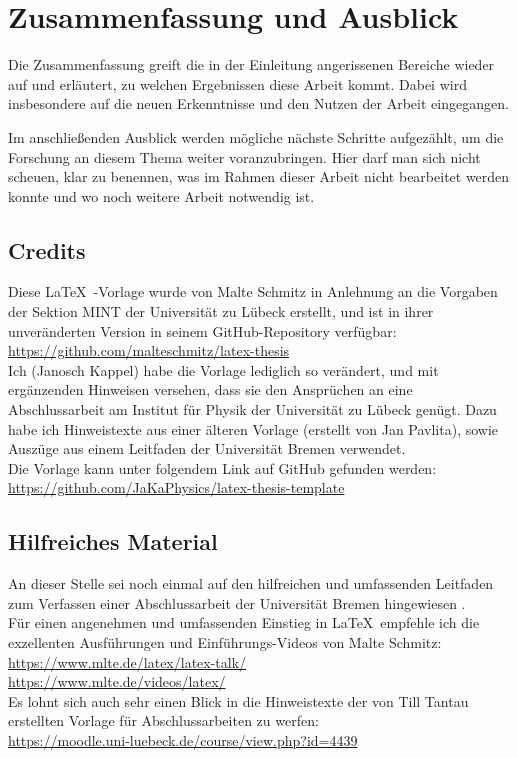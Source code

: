 
\chapter{Zusammenfassung und Ausblick}
\label{chapter-fazit}

Die Zusammenfassung greift die in der Einleitung angerissenen Bereiche wieder auf und erläutert, zu welchen Ergebnissen diese Arbeit kommt. Dabei wird insbesondere auf die neuen Erkenntnisse und den Nutzen der Arbeit eingegangen.

Im anschließenden Ausblick werden mögliche nächste Schritte aufgezählt, um die Forschung an diesem Thema weiter voranzubringen. Hier darf man sich nicht scheuen, klar zu benennen, was im Rahmen dieser Arbeit nicht bearbeitet werden konnte und wo noch weitere Arbeit notwendig ist.

\section{Credits}

Diese \LaTeX\ -Vorlage wurde von Malte Schmitz in Anlehnung an die Vorgaben der Sektion MINT der Universität zu Lübeck erstellt, und ist in ihrer unveränderten Version in seinem GitHub-Repository verfügbar: \\
\url{https://github.com/malteschmitz/latex-thesis} \\

Ich (Janosch Kappel) habe die Vorlage lediglich so verändert, und mit ergänzenden Hinweisen versehen, dass sie den Ansprüchen an eine Abschlussarbeit am Institut für Physik der Universität zu Lübeck genügt. Dazu habe ich Hinweistexte aus einer älteren Vorlage (erstellt von Jan Pavlita), sowie Auszüge aus einem Leitfaden der Universität Bremen \cite{uni-bremen} verwendet. \\

Die Vorlage kann unter folgendem Link auf GitHub gefunden werden:\\
\url{https://github.com/JaKaPhysics/latex-thesis-template}

\section{Hilfreiches Material}

An dieser Stelle sei noch einmal auf den hilfreichen und umfassenden Leitfaden zum Verfassen einer Abschlussarbeit der Universität Bremen hingewiesen \cite{uni-bremen}. \\

Für einen angenehmen und umfassenden Einstieg in \LaTeX\ empfehle ich die exzellenten Ausführungen und Einführungs-Videos von Malte Schmitz: \\
\url{https://www.mlte.de/latex/latex-talk/} \\
\url{https://www.mlte.de/videos/latex/} \\

Es lohnt sich auch sehr einen Blick in die Hinweistexte der von Till Tantau erstellten Vorlage für Abschlussarbeiten zu werfen: \\
\url{https://moodle.uni-luebeck.de/course/view.php?id=4439}
